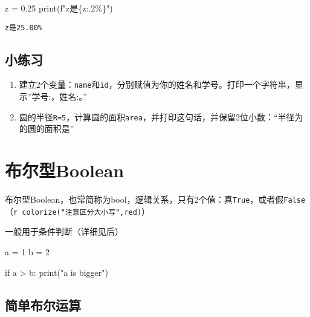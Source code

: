 \documentclass[
  letterpaper,
  DIV=11,
  numbers=noendperiod]{scrreprt}
\newenvironment{Shaded}{\begin{snugshade}}{\end{snugshade}}
\newcommand{\BuiltInTok}[1]{\textcolor[rgb]{0.00,0.23,0.31}{#1}}
\newcommand{\ControlFlowTok}[1]{\textcolor[rgb]{0.00,0.23,0.31}{#1}}
\newcommand{\DecValTok}[1]{\textcolor[rgb]{0.68,0.00,0.00}{#1}}
\newcommand{\FloatTok}[1]{\textcolor[rgb]{0.68,0.00,0.00}{#1}}
\newcommand{\NormalTok}[1]{\textcolor[rgb]{0.00,0.23,0.31}{#1}}
\newcommand{\OperatorTok}[1]{\textcolor[rgb]{0.37,0.37,0.37}{#1}}
\newcommand{\SpecialCharTok}[1]{\textcolor[rgb]{0.37,0.37,0.37}{#1}}
\newcommand{\SpecialStringTok}[1]{\textcolor[rgb]{0.13,0.47,0.30}{#1}}
\newcommand{\StringTok}[1]{\textcolor[rgb]{0.13,0.47,0.30}{#1}}
\begin{document}
\begin{Shaded}
\begin{Highlighting}[]
\NormalTok{z }\OperatorTok{=} \FloatTok{0.25}
\BuiltInTok{print}\NormalTok{(}\SpecialStringTok{f"z是}\SpecialCharTok{\{}\NormalTok{z}\SpecialCharTok{:.2\%\}}\SpecialStringTok{"}\NormalTok{)}
\end{Highlighting}
\end{Shaded}

\begin{verbatim}
z是25.00%
\end{verbatim}

\hypertarget{ux5c0fux7ec3ux4e60-1}{%
\subsection{小练习}\label{ux5c0fux7ec3ux4e60-1}}

\begin{enumerate}
\def\labelenumi{\arabic{enumi}.}
\item
  建立2个变量：\texttt{name}和\texttt{id}，分别赋值为你的姓名和学号。打印一个字符串，显示''学号:，姓名:。''
\item
  圆的半径\texttt{R=5}，计算圆的面积\texttt{area}，并打印这句话，并保留2位小数：``半径为的圆的面积是''
\end{enumerate}

\hypertarget{ux5e03ux5c14ux578bboolean}{%
\section{布尔型Boolean}\label{ux5e03ux5c14ux578bboolean}}

布尔型Boolean，也常简称为bool，逻辑关系，只有2个值：真\texttt{True}，或者假\texttt{False}（\texttt{r\ colorize("注意区分大小写",\textquotesingle{}red\textquotesingle{})}）

一般用于条件判断（详细见后）

\begin{Shaded}
\begin{Highlighting}[]
\NormalTok{a }\OperatorTok{=} \DecValTok{1}
\NormalTok{b }\OperatorTok{=} \DecValTok{2}

\ControlFlowTok{if}\NormalTok{ a }\OperatorTok{\textgreater{}}\NormalTok{ b:}
  \BuiltInTok{print}\NormalTok{(}\StringTok{"a is bigger"}\NormalTok{)}
\end{Highlighting}
\end{Shaded}

\hypertarget{ux7b80ux5355ux5e03ux5c14ux8fd0ux7b97}{%
\subsection{简单布尔运算}\label{ux7b80ux5355ux5e03ux5c14ux8fd0ux7b97}}
\end{document}

